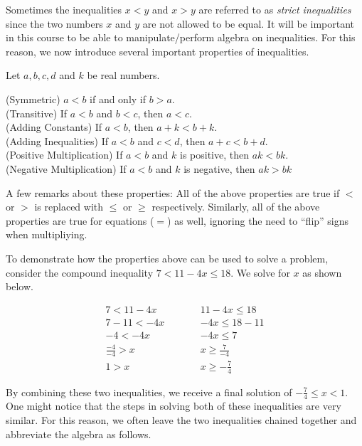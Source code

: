\documentclass{article}
\newcommand{\tb}[1]{\textbf{#1}}
\newenvironment{mybox}[3]{
    \begin{center}
    \begin{tcolorbox}[width=#2\textwidth, colback={#3}, colbacktitle={#3}, title={\tb{#1}}, coltitle={black}, colframe={#3}, arc=1pt, breakable]}
    {\end{tcolorbox} 
    \end{center}}
\begin{document}
Sometimes the inequalities $x<y$ and $x>y$ are referred to as \emph{strict inequalities} since the two numbers $x$ and $y$ are not allowed to be equal. It will be important in this course to be able to manipulate/perform algebra on inequalities. For this reason, we now introduce several important properties of inequalities.

\begin{mybox}{Properties of Inequalities}{0.8}{babyblue}
    \doublespacing
    Let $a,b,c,d$ and $k$ be real numbers.

    \indent \quad (Symmetric) $a<b$ if and only if $b>a$. \\ 
    \indent \quad (Transitive) If $a<b$ and $b<c$, then $a<c$. \\ 
    \indent \quad (Adding Constants) If $a<b$, then $a+k<b+k$. \\
    \indent \quad (Adding Inequalities) If $a<b$ and $c<d$, then $a+c<b+d$. \\
    \indent \quad (Positive Multiplication) If $a<b$ and $k$ is positive, then $ak < bk$. \\
    \indent \quad (Negative Multiplication) If $a<b$ and $k$ is negative, then $ak > bk$
\end{mybox}

A few remarks about these properties: All of the above properties are true if $<$ or $>$ is replaced with $\leq$ or $\geq$ respectively. Similarly, all of the above properties are true for equations ($=$) as well, ignoring the need to ``flip'' signs when multipliying. 

To demonstrate how the properties above can be used to solve a problem, consider the compound inequality $7 < 11 - 4x \leq 18$. We solve for $x$ as shown below.

\begin{align*}
    7 < 11 - 4x & \qquad & 11 - 4x \leq 18 \\
    7 - 11 < - 4x & \qquad & -4x \leq 18 - 11 \\
    -4 < -4x & \qquad & -4x \leq 7 \\
    \frac{-4}{-4} > x & \qquad & x \geq \frac{7}{-4} \\
    1 > x & \qquad & x \geq -\frac{7}{4}
\end{align*}

By combining these two inequalities, we receive a final solution of $-\frac{7}{4} \leq x < 1$. One might notice that the steps in solving both of these inequalities are very similar. For this reason, we often leave the two inequalities chained together and abbreviate the algebra as follows.
\end{document}
